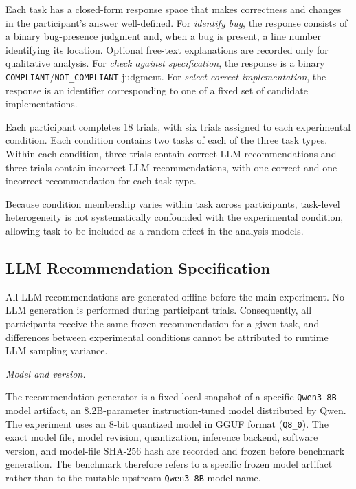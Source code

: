 \documentclass[oneside,final,14pt,a4paper]{extreport}
\begin{document}
Each task has a closed-form response space that makes correctness 
and changes in the participant's answer well-defined. For \emph{identify bug}, 
the response consists of a binary bug-presence judgment and, when a bug 
is present, a line number identifying its location. Optional free-text 
explanations are recorded only for qualitative analysis. 
For \emph{check against specification}, the response is a binary 
\texttt{COMPLIANT}/\texttt{NOT\_COMPLIANT} judgment. 
For \emph{select correct implementation}, the response is an identifier 
corresponding to one of a fixed set of candidate implementations.

Each participant completes 18 trials, with six trials assigned to each
experimental condition. Each condition contains two tasks of each of the
three task types. Within each condition, three trials contain correct LLM
recommendations and three trials contain incorrect LLM recommendations, with
one correct and one incorrect recommendation for each task type.

Because condition membership varies within task across participants,
task-level heterogeneity is not systematically confounded with the
experimental condition, allowing task to be included as a random effect in
the analysis models.

\subsection{LLM Recommendation Specification}
\label{subsec:llm-spec}

All LLM recommendations are generated offline before the main experiment. No
LLM generation is performed during participant trials. Consequently, all
participants receive the same frozen recommendation for a given task, and
differences between experimental conditions cannot be attributed to runtime
LLM sampling variance.

\emph{Model and version.}

The recommendation generator is a fixed local snapshot of a specific
\texttt{Qwen3-8B} model artifact, an 8.2B-parameter instruction-tuned model
distributed by Qwen. The experiment uses an 8-bit quantized model in GGUF
format (\texttt{Q8\_0}). The exact model file, model revision, quantization,
inference backend, software version, and model-file SHA-256 hash are recorded
and frozen before benchmark generation. The benchmark therefore refers to a
specific frozen model artifact rather than to the mutable upstream
\texttt{Qwen3-8B} model name.
\end{document}
